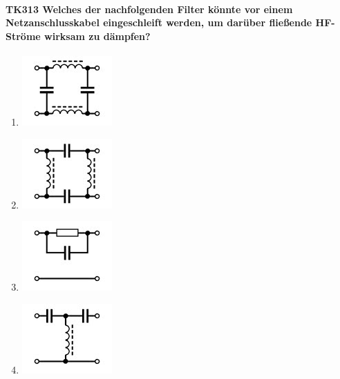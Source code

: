 \documentclass[8pt]{article}
\begin{document}
\paragraph*{TK313 Welches der nachfolgenden Filter könnte vor einem Netzanschlusskabel eingeschleift werden, um darüber fließende HF-Ströme wirksam zu dämpfen?}
\begin{enumerate}[nolistsep,label=\Alph*]
\item
\begin{center}
	\begin{minipage}{\linewidth}
		\centering
		\includegraphics[scale=1.0]{pics/tk313_a.jpg}
	\end{minipage}
\end{center}
\item
\begin{center}
	\begin{minipage}{\linewidth}
		\centering
		\includegraphics[scale=1.0]{pics/tk313_b.jpg}
	\end{minipage}
\end{center}
\item
\begin{center}
	\begin{minipage}{\linewidth}
		\centering
		\includegraphics[scale=1.0]{pics/tk313_c.jpg}
	\end{minipage}
\end{center}
\item
\begin{center}
	\begin{minipage}{\linewidth}
		\centering
		\includegraphics[scale=1.0]{pics/tk313_d.jpg}
	\end{minipage}
\end{center}
\end{enumerate}
\end{document}
